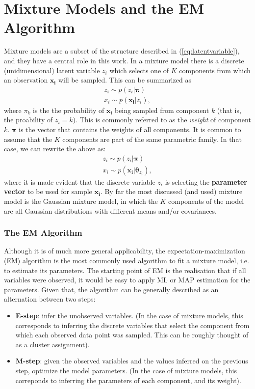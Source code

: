 \section{Mixture Models and the EM Algorithm}
\label{section:mmodels}
Mixture models are a subset of the structure  described in (\ref{eq:latentvariable}),
and they have a central role in this work. In a mixture model there is a discrete
(unidimensional) latent variable $z_i$ which selects one of $K$ components from which an observation
$\bm{x_i}$ will be sampled. This can be summarized as
\begin{align}
    z_i \sim p(z_i | \bm\pi) \\
    x_i \sim p(\bm{x_i} | z_i),
\end{align} where $\pi_k$ is the the probability of $\bm{x_i}$ being sampled
from component $k$ (that is, the proability of $z_i = k$). This is commonly referred
to as the \emph{weight} of component $k$. $\bm\pi$ is the vector that contains
the weights of all components.
It is common to assume that the $K$ components are part of the same
parametric family. In that case, we can rewrite the above as:
\begin{align}
    z_i \sim p(z_i | \bm\pi) \\
    x_i \sim p(\bm{x_i} | \bm{\theta}_{z_i}),
\end{align} where it is made evident that the discrete variable $z_i$ is selecting
the \textbf{parameter vector} to be used for sample $\bm{x_i}$. By far the most
discussed (and used) mixture model is the Gaussian mixture model, in which the
$K$ components of the model are all Gaussian distributions with different means
and/or covariances.

\subsubsection{The EM Algorithm}
Although it is of much more general applicability, the expectation-maximization
(EM) algorithm is the most commonly used algorithm to fit a mixture model, i.e.
to estimate its parameters. The starting point of EM is the realisation that if
all variables were observed, it would be easy to apply ML or MAP estimation for
the parameters. Given that, the algorithm can be generally described as an alternation
between two steps:
\begin{itemize}
    \item \textbf{E-step}: infer the unobserved variables.
        (In the case of mixture models, this corresponds to inferring the discrete
        variables that select the component from which each observed data point
        was sampled. This can be roughly thought of as a cluster assignment).
    \item \textbf{M-step}: given the observed variables and the values inferred
        on the previous step, optimize the model parameters. (In the case of 
        mixture models, this correponds to inferring the parameters of each
        component, and its weight).
\end{itemize}

